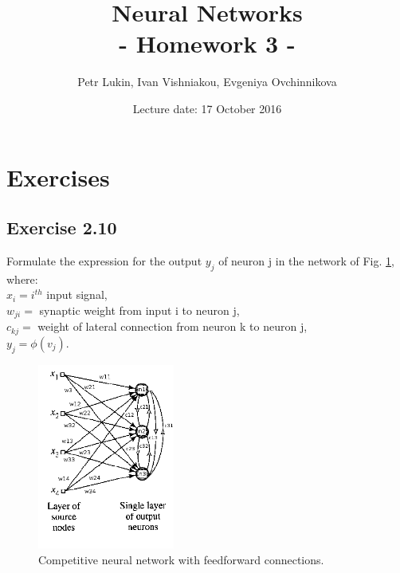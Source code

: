 \documentclass[a4paper, 12pt]{article}
\title{Neural Networks  \\
				- Homework 3 -}
\author{Petr Lukin, Ivan Vishniakou, Evgeniya Ovchinnikova}
\date{Lecture date: 17 October 2016}
\begin{document}


\maketitle


\section{Exercises}



\subsection{Exercise 2.10}

Formulate the expression for the output $y_j$ of neuron j in the network of Fig. \ref{fig:competiotionNN}, where:\\

$x_i = i^{th}$ input signal,\\
$w_{ji} = $ synaptic weight from input i to neuron j,\\
$c_{kj} = $ weight of lateral connection from neuron k to neuron j,\\
$y_j = \phi(v_j)$.\\


 
\begin{figure}[h]
  \centering
  \caption{Competitive neural network with feedforward connections.\label{fig:competiotionNN}}
  \includegraphics[width=0.4\textwidth]{competiotionNN}
\end{figure}
\end{document}
